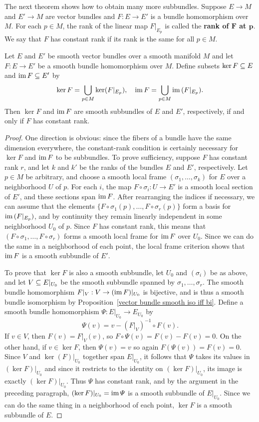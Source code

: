 The next theorem shows how to obtain many more subbundles. Suppose $E\to M$ and $E'\to M$ are vector bundles and $F:E\to E'$ is a bundle homomorphism over $M$. For each $p\in M$, the rank of the linear map $F|_{E_p}$ is called the \textbf{rank of $\bm{F}$ at $\bm{p}$}. We say that $F$ has constant rank if its rank is the same for all $p\in M$.
\begin{theorem}
Let $E$ and $E'$ be smooth vector bundles over a smooth manifold $M$ and let $F:E\to E'$ be a smooth bundle homomorphism over $M$. Define subsets $\ker F\subseteq E$ and $\mathrm{im}\, F\subseteq E'$ by
\[\ker F=\bigcup_{p\in M}\ker(F|_{E_p}),\quad\mathrm{im}\, F=\bigcup_{p\in M}\mathrm{im}\,(F|_{E_p}).\]
Then $\ker F$ and $\mathrm{im}\, F$ are smooth subbundles of $E$ and $E'$, respectively, if and only if $F$ has constant rank.
\end{theorem}
\begin{proof}
One direction is obvious: since the fibers of a bundle have the same dimension everywhere, the constant-rank condition is certainly necessary for $\ker F$ and $\mathrm{im}\, F$ to be subbundles. To prove sufficiency, suppose $F$ has constant rank $r$, and let $k$ and $k'$ be the ranks of the bundles $E$ and $E'$, respectively. Let $p\in M$ be arbitrary, and choose a smooth local frame $(\sigma_1,\dots,\sigma_k)$ for $E$ over a neighborhood $U$ of $p$. For each $i$, the map $F\circ\sigma_i:U\to E'$ is a smooth local section of $E'$, and these sections span $\mathrm{im}\, F$. After rearranging the indices if necessary, we can assume that the elements $\{F\circ\sigma_1(p),\dots,F\circ\sigma_r(p)\}$ form a basis for $\mathrm{im}\,(F|_{E_p})$, and by continuity they remain linearly independent in some neighborhood $U_0$ of $p$. Since $F$ has constant rank, this means that $(F\circ\sigma_1,\dots,F\circ\sigma_r)$ forms a smooth local frame for $\mathrm{im}\, F$ over $U_0$. Since we can do the same in a neighborhood of each point, the local frame criterion shows that $\mathrm{im}\, F$ is a smooth subbundle of $E'$.\par
To prove that $\ker F$ is also a smooth subbundle, let $U_0$ and $(\sigma_i)$ be as above, and let $V\subseteq E|_{U_0}$ be the smooth subbundle spanned by $\sigma_1,\dots,\sigma_r$. The smooth bundle homomorphism $F|_V:V\to(\mathrm{im}\, F)|_{U_0}$ is bijective, and is thus a smooth bundle isomorphism by Proposition~\ref{vector bundle smooth iso iff bi}. Define a smooth bundle homomorphism $\varPsi:E|_{U_0}\to E_{U_0}$ by
\[\varPsi(v)=v-(F|_V)^{-1}\circ F(v).\]
If $v\in V$, then $F(v)=F|_V(v)$, so $F\circ\varPsi(v)=F(v)-F(v)=0$. On the other hand, if $v\in\ker F$, then $\varPsi(v)=v$ so again $F(\varPsi(v))=F(v)=0$. Since $V$ and $\ker(F)|_{U_0}$ together span $E|_{U_0}$, it follows that $\varPsi$ takes its values in $(\ker F)|_{U_0}$ and since it restricts to the identity on $(\ker F)|_{U_0}$, its image is exactly $(\ker F)|_{U_0}$. Thus $\varPsi$ has constant rank, and by the argument in the preceding paragraph, $(\ker F)|_{U_0}=\mathrm{im}\,\varPsi$ is a smooth subbundle of $E|_{U_0}$. Since we can do the same thing in a neighborhood of each point, $\ker F$ is a smooth subbundle of $E$.
\end{proof}
